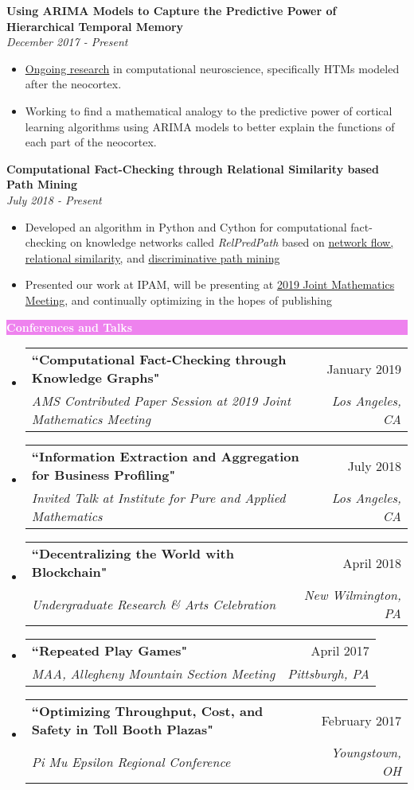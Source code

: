 \documentclass[letterpaper,11pt]{article}
\makeatletter
\newcommand{\resitem}[1]{\item #1 \vspace{-2pt}}
\newcommand{\resheading}[1]{{\large \colorbox{violet}{\begin{minipage}{\textwidth}{\textbf{#1 \vphantom{p\^{E}}}}\end{minipage}}}}
\newcommand{\ressubheading}[4]{
	\begin{tabular*}{7.0in}{l@{\extracolsep{\fill}}r}
		\textbf{#1} & #2 \\
		\textit{#3} & \textit{#4} \\
	\end{tabular*}\vspace{-6pt}}
\makeatother
\begin{document}
		\textbf{Using ARIMA Models to Capture the Predictive Power of Hierarchical Temporal Memory} \\ \textit{December 2017 - Present}
		\begin{itemize}[topsep=3pt, itemsep=1pt]
			\resitem{\href{https://github.com/alexandermichels/HonorsResearch}{Ongoing research} in computational neuroscience, specifically HTMs modeled after the neocortex.}
			\resitem{Working to find a mathematical analogy to the predictive power of cortical learning algorithms using ARIMA models to better explain the functions of each part of the neocortex.}
		\end{itemize}
		
		\textbf{Computational Fact-Checking through Relational Similarity based Path Mining} \\	\textit{July 2018 - Present}
		\begin{itemize}[topsep=3pt, itemsep=1pt]
			\resitem{Developed an algorithm in Python and Cython for computational fact-checking on knowledge networks called \textit{RelPredPath} based on \href{https://arxiv.org/pdf/1708.07239.pdf}{network flow, relational similarity,} and \href{https://arxiv.org/pdf/1510.05911.pdf}{discriminative path mining} }
			\resitem{Presented our work at IPAM, will be presenting at \href{https://jointmathematicsmeetings.org/meetings/national/jmm2019/2217_progfull.html?fbclid=IwAR0AccnUi\_yuX4UdnTVF-cCFVJ5lNYAdIvzw7TPS81eGXk1pn5PvQjaGyTo\#2217:AMSCP33}{2019 Joint Mathematics Meeting}, and continually optimizing in the hopes of publishing}
		\end{itemize}
	
	\pagebreak
	
	
		\resheading{\textcolor{white}{Conferences and Talks}}
	
		\begin{itemize}[topsep=3pt, itemsep=1pt]
			\item
			\ressubheading{``Computational Fact-Checking through Knowledge Graphs"}{January 2019}{AMS Contributed Paper Session at 2019 Joint Mathematics Meeting}{Los Angeles, CA}
			\item
			\ressubheading{``Information Extraction and Aggregation for Business Profiling"}{July 2018}{Invited Talk at Institute for Pure and Applied Mathematics}{Los Angeles, CA}
			\item
			\ressubheading{``Decentralizing the World with Blockchain"}{April 2018}{Undergraduate Research \& Arts Celebration}{New Wilmington, PA}
			\item
			\ressubheading{``Repeated Play Games"}{April 2017}{MAA, Allegheny Mountain Section Meeting}{Pittsburgh, PA}
			\item
			\ressubheading{``Optimizing Throughput, Cost, and Safety in Toll Booth Plazas"}{February 2017}{Pi Mu Epsilon Regional Conference}{Youngstown, OH}
			
		\end{itemize}
	
\end{document}
